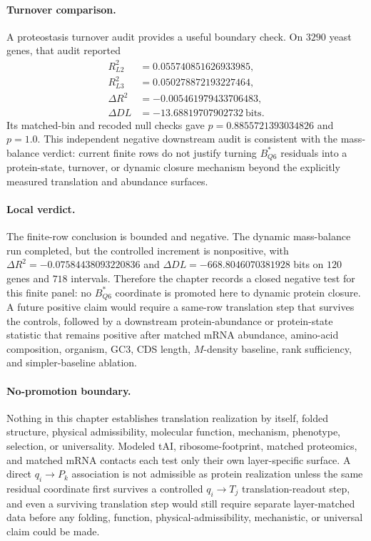 \paragraph{Turnover comparison.}
A proteostasis turnover audit provides a useful boundary check.  On $3290$ yeast genes, that audit reported
$$
\begin{aligned}
R^2_{L2} &= 0.055740851626933985,\\
R^2_{L3} &= 0.050278872193227464,\\
\Delta R^2 &= -0.005461979433706483,\\
\Delta DL &= -13.68819707902732\ \text{bits}.
\end{aligned}
$$
Its matched-bin and recoded null checks gave $p=0.8855721393034826$ and $p=1.0$.  This independent negative downstream audit is consistent with the mass-balance verdict: current finite rows do not justify turning $B^{\ast}_{Q6}$ residuals into a protein-state, turnover, or dynamic closure mechanism beyond the explicitly measured translation and abundance surfaces.

\paragraph{Local verdict.}
The finite-row conclusion is bounded and negative.  The dynamic mass-balance run completed, but the controlled increment is nonpositive, with $\Delta R^2=-0.07584438093220836$ and $\Delta DL=-668.8046070381928$ bits on $120$ genes and $718$ intervals.  Therefore the chapter records a closed negative test for this finite panel: no $B^{\ast}_{Q6}$ coordinate is promoted here to dynamic protein closure.  A future positive claim would require a same-row translation step that survives the controls, followed by a downstream protein-abundance or protein-state statistic that remains positive after matched mRNA abundance, amino-acid composition, organism, GC3, CDS length, $M$-density baseline, rank sufficiency, and simpler-baseline ablation.

\paragraph{No-promotion boundary.}
Nothing in this chapter establishes translation realization by itself, folded structure, physical admissibility, molecular function, mechanism, phenotype, selection, or universality.  Modeled tAI, ribosome-footprint, matched proteomics, and matched mRNA contacts each test only their own layer-specific surface.  A direct $q_i \to P_k$ association is not admissible as protein realization unless the same residual coordinate first survives a controlled $q_i \to T_j$ translation-readout step, and even a surviving translation step would still require separate layer-matched data before any folding, function, physical-admissibility, mechanistic, or universal claim could be made.